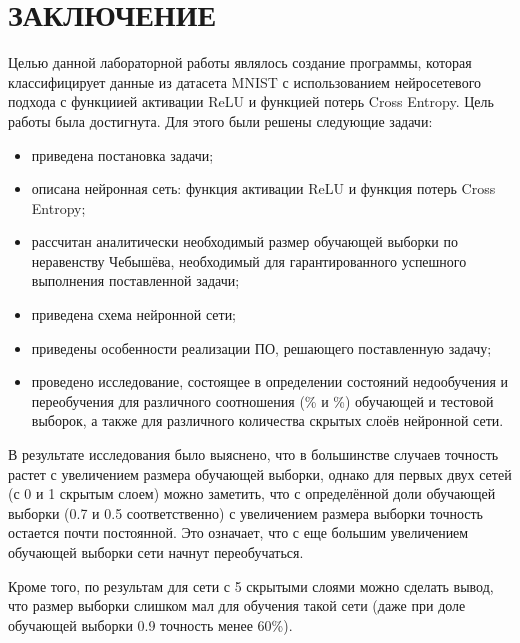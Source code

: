 \documentclass[12pt]{report}
\begin{document}
\chapter*{ЗАКЛЮЧЕНИЕ}
Целью данной лабораторной работы являлось создание программы, которая классифицирует данные из датасета MNIST \cite{bib:mnist} с использованием нейросетевого подхода с функциией активации ReLU и функцией потерь Cross Entropy. 
Цель работы была достигнута.
Для этого были решены следующие задачи:
\begin{itemize}
    \item приведена постановка задачи;
    \item описана нейронная сеть: функция активации ReLU и функция потерь Cross Entropy;
    \item рассчитан аналитически необходимый размер обучающей выборки по неравенству Чебышёва, необходимый для гарантированного успешного выполнения поставленной задачи;
    \item приведена схема нейронной сети;
    \item приведены особенности реализации ПО, решающего поставленную задачу;
    \item проведено исследование, состоящее в определении состояний недообучения и переобучения для различного соотношения (\% и \%) обучающей и тестовой выборок, а также для различного количества скрытых слоёв нейронной сети.
\end{itemize}

В результате исследования было выяснено, что в большинстве случаев точность растет с увеличением размера обучающей выборки, однако для первых двух сетей (с 0 и 1 скрытым слоем) можно заметить, что с определённой доли обучающей выборки (0.7 и 0.5 соответственно) с увеличением размера выборки точность остается почти постоянной. Это означает, что с еще большим увеличением обучающей выборки сети начнут переобучаться.

Кроме того, по результам для сети с 5 скрытыми слоями можно сделать вывод, что размер выборки слишком мал для обучения такой сети (даже при доле обучающей выборки 0.9 точность менее 60\%).  
\printbibliography[title={СПИСОК ИСПОЛЬЗОВАННЫХ\\ ИСТОЧНИКОВ}]
\end{document}

